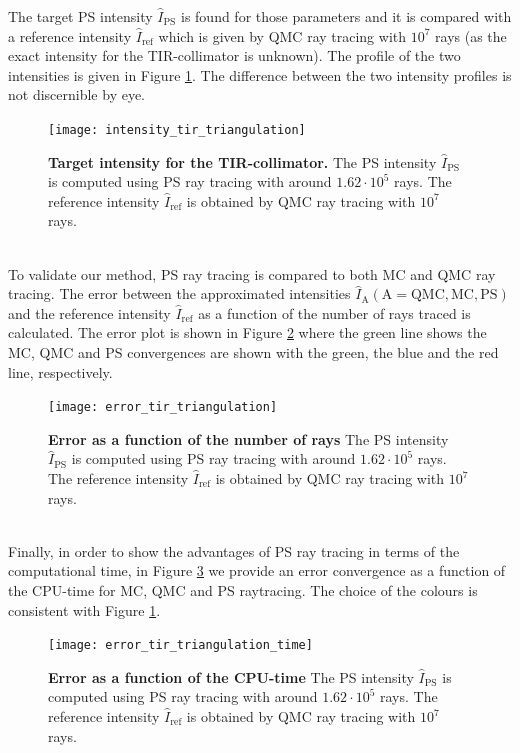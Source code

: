 The target PS intensity $\hat{I}_{\textrm{PS}}$ is found for those parameters and it is compared with a reference intensity $\hat{I}_{\textrm{ref}}$ which is given by QMC ray tracing with $10^7$ rays (as the exact intensity for the TIR-collimator is unknown). The profile of the two intensities is given in Figure \ref{fig:intensity_tir_triangulation}. 
The difference between the two intensity profiles is not discernible by eye.
 \begin{figure}[ht]
  \center
  \texttt{[image: intensity\_tir\_triangulation]}
  \caption{\textbf{Target intensity for the TIR-collimator.} The PS intensity $\hat{I}_{\textrm{PS}}$ is computed using PS ray tracing with around $1.62\cdot 10^5$ rays. The reference intensity $\hat{I}_{\textrm{ref}}$ is obtained by QMC ray tracing with $10^7$ rays.}
  \label{fig:intensity_tir_triangulation}
\end{figure}
\\ \indent
To validate our method, PS ray tracing is compared to both MC and QMC ray tracing. The error between the approximated intensities $\hat{I}_{\textrm{A}} (\textrm{A}=\textrm{QMC}, \textrm{MC}, \textrm{PS})$ and the reference intensity $\hat{I}_{\textrm{ref}}$ as a function of the number of rays traced is calculated. The error plot is shown in Figure \ref{fig:error_tir_triangulation} where the green line shows the MC, QMC and PS convergences are shown with the green, the blue and the red line, respectively. 
 \begin{figure}[ht]
  \center
  \texttt{[image: error\_tir\_triangulation]}
  \caption{\textbf{Error as a function of the number of rays} The PS intensity $\hat{I}_{\textrm{PS}}$ is computed using PS ray tracing with around $1.62\cdot 10^5$ rays. The reference intensity $\hat{I}_{\textrm{ref}}$ is obtained by QMC ray tracing with $10^7$ rays.}
  \label{fig:error_tir_triangulation}
\end{figure}
\\ \indent Finally, in order to show the advantages of PS ray tracing in terms of the computational time, in Figure \ref{fig:error_tir_triangulation_time} we provide an error convergence as a function of the CPU-time for MC, QMC and PS raytracing. The choice of the colours is consistent with Figure \ref{fig:intensity_tir_triangulation}.
\begin{figure}[ht]
  \center
  \texttt{[image: error\_tir\_triangulation\_time]}
  \caption{\textbf{Error as a function of the CPU-time} The PS intensity $\hat{I}_{\textrm{PS}}$ is computed using PS ray tracing with around $1.62\cdot 10^5$ rays. The reference intensity $\hat{I}_{\textrm{ref}}$ is obtained by QMC ray tracing with $10^7$ rays.}
  \label{fig:error_tir_triangulation_time}
\end{figure}
